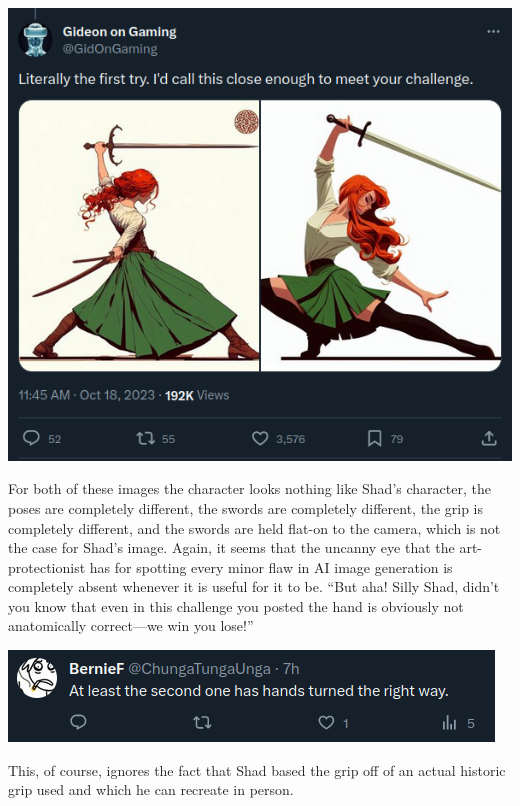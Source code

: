 \documentclass[11pt]{article}
\begin{document}
\begin{center}
\includegraphics[width=.9\linewidth]{./images/shad sword girl completely different in replication.png}
\end{center}

For both of these images the character looks nothing like Shad's character, the poses are completely different, the swords are completely different, the grip is completely different, and the swords are held flat-on to the camera, which is not the case for Shad's image. Again, it seems that the uncanny eye that the art-protectionist has for spotting every minor flaw in AI image generation is completely absent whenever it is useful for it to be. ``But aha! Silly Shad, didn't you know that even in this challenge you posted the hand is obviously not anatomically correct---we win you lose!''

\begin{center}
\includegraphics[width=.9\linewidth]{./images/shad sword girl hand broken.png}
\end{center}

This, of course, ignores the fact that Shad based the grip off of an actual historic grip used and which he can recreate in person.
\end{document}
